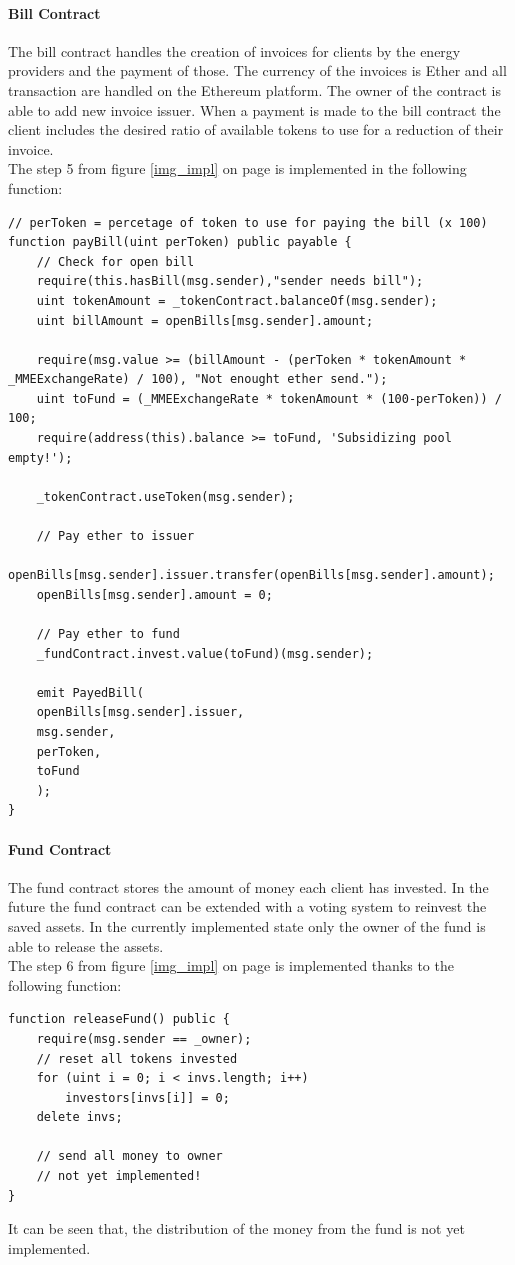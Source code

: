 \documentclass[11pt]{article}
\begin{document}
\paragraph{Bill Contract}
The bill contract handles the creation of invoices for clients by the energy providers and the payment of those. The currency of the invoices is Ether and all transaction are handled on the Ethereum platform. The owner of the contract is able to add new invoice issuer. When a payment is made to the bill contract the client includes the desired ratio of available tokens to use for a reduction of their invoice.\\
The step 5 from figure \ref{img_impl} on page \pageref{img_impl} is implemented in  the following function:
\begin{lstlisting}[language=Solidity, firstnumber=68,caption={src/smartcontracts/contracts/Bill.sol},captionpos=b]
// perToken = percetage of token to use for paying the bill (x 100)
function payBill(uint perToken) public payable {
	// Check for open bill
	require(this.hasBill(msg.sender),"sender needs bill");
	uint tokenAmount = _tokenContract.balanceOf(msg.sender);
	uint billAmount = openBills[msg.sender].amount;

	require(msg.value >= (billAmount - (perToken * tokenAmount * _MMEExchangeRate) / 100), "Not enought ether send.");
	uint toFund = (_MMEExchangeRate * tokenAmount * (100-perToken)) / 100;
	require(address(this).balance >= toFund, 'Subsidizing pool empty!');

	_tokenContract.useToken(msg.sender);

	// Pay ether to issuer
	openBills[msg.sender].issuer.transfer(openBills[msg.sender].amount);
	openBills[msg.sender].amount = 0;

	// Pay ether to fund
	_fundContract.invest.value(toFund)(msg.sender);

	emit PayedBill(
	openBills[msg.sender].issuer,
	msg.sender,
	perToken,
	toFund
	);
}
\end{lstlisting}
\newpage
\paragraph{Fund Contract}
The fund contract stores the amount of money each client has invested. In the future the fund contract can be extended with a voting system to reinvest the saved assets. In the currently implemented state only the owner of the fund is able to release the assets.\\
The step 6 from figure \ref{img_impl} on page \pageref{img_impl} is implemented thanks to the following function:
\begin{lstlisting}[language=Solidity, firstnumber=17,caption={src/smartcontracts/contracts/Fund.sol},captionpos=b]
function releaseFund() public {
	require(msg.sender == _owner);
	// reset all tokens invested
	for (uint i = 0; i < invs.length; i++)
	    investors[invs[i]] = 0;
	delete invs;
	
	// send all money to owner
	// not yet implemented!
}
\end{lstlisting}
It can be seen that, the distribution of the money from the fund is not yet implemented.
\end{document}
